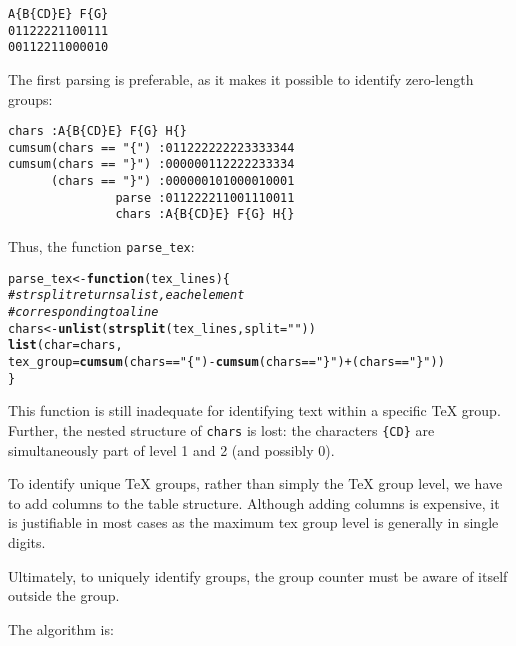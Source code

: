 \documentclass[b5paper]{scrartcl}\usepackage[]{graphicx}\usepackage[]{color}
\makeatletter
\newcommand{\hlstr}[1]{\textcolor[rgb]{0.192,0.494,0.8}{#1}}%
\newcommand{\hlcom}[1]{\textcolor[rgb]{0.678,0.584,0.686}{\textit{#1}}}%
\newcommand{\hlopt}[1]{\textcolor[rgb]{0,0,0}{#1}}%
\newcommand{\hlstd}[1]{\textcolor[rgb]{0.345,0.345,0.345}{#1}}%
\newcommand{\hlkwa}[1]{\textcolor[rgb]{0.161,0.373,0.58}{\textbf{#1}}}%
\newcommand{\hlkwb}[1]{\textcolor[rgb]{0.69,0.353,0.396}{#1}}%
\newcommand{\hlkwc}[1]{\textcolor[rgb]{0.333,0.667,0.333}{#1}}%
\newcommand{\hlkwd}[1]{\textcolor[rgb]{0.737,0.353,0.396}{\textbf{#1}}}%
\newenvironment{kframe}{%
 \def\at@end@of@kframe{}%
 \ifinner\ifhmode%
  \def\at@end@of@kframe{\end{minipage}}%
  \begin{minipage}{\columnwidth}%
 \fi\fi%
 \def\FrameCommand##1{\hskip\@totalleftmargin \hskip-\fboxsep
 \colorbox{shadecolor}{##1}\hskip-\fboxsep
     \hskip-\linewidth \hskip-\@totalleftmargin \hskip\columnwidth}%
 \MakeFramed {\advance\hsize-\width
   \@totalleftmargin\z@ \linewidth\hsize
   \@setminipage}}%
 {\par\unskip\endMakeFramed%
 \at@end@of@kframe}
\newenvironment{knitrout}{}{} %
\makeatother
\begin{document}
\begin{lstlisting}
A{B{CD}E} F{G}
01122221100111
00112211000010
\end{lstlisting}

The first parsing is preferable, as it makes it possible to identify zero-length groups:

\begin{lstlisting}[columns=fixed]
               chars :A{B{CD}E} F{G} H{}
cumsum(chars == "{") :011222222223333344
cumsum(chars == "}") :000000112222233334
      (chars == "}") :000000101000010001
               parse :011222211001110011
               chars :A{B{CD}E} F{G} H{}
\end{lstlisting}

Thus, the function \lstinline[language=R]!parse_tex!:


\begin{knitrout}\small
{}\color{fgcolor}\begin{kframe}
\begin{alltt}
\hlstd{parse_tex} \hlkwb{<-} \hlkwa{function}\hlstd{(}\hlkwc{tex_lines}\hlstd{) \{}
  \hlcom{# strsplit returns a list, each element}
  \hlcom{# corresponding to a line}
  \hlstd{chars} \hlkwb{<-} \hlkwd{unlist}\hlstd{(}\hlkwd{strsplit}\hlstd{(tex_lines,} \hlkwc{split} \hlstd{=} \hlstr{""}\hlstd{))}
  \hlkwd{list}\hlstd{(}\hlkwc{char} \hlstd{= chars,}
       \hlkwc{tex_group} \hlstd{=} \hlkwd{cumsum}\hlstd{(chars} \hlopt{==} \hlstr{"\{"}\hlstd{)} \hlopt{-} \hlkwd{cumsum}\hlstd{(chars} \hlopt{==} \hlstr{"\}"}\hlstd{)} \hlopt{+} \hlstd{(chars} \hlopt{==} \hlstr{"\}"}\hlstd{))}
\hlstd{\}}
\end{alltt}
\end{kframe}
\end{knitrout}

This function is still inadequate for identifying text within a specific \TeX{} group.
Further, the nested structure of \texttt{chars} is lost: the characters \lstinline!{CD}! are simultaneously part of level 1 and 2 (and possibly 0).

To identify unique \TeX{} groups, rather than simply the \TeX{} group level, we have to add columns to the table structure.
Although adding columns is expensive, it is justifiable in most cases as the maximum tex group level is generally in single digits.

Ultimately, to uniquely identify groups, the group counter must be aware of itself outside the group.

The algorithm is:
\end{document}
